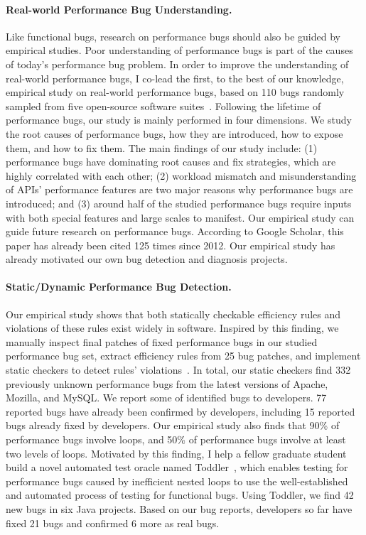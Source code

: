 \documentclass[10pt]{article}
\begin{document}
\paragraph{Real-world Performance Bug Understanding.}
Like functional bugs, research on performance bugs should also be guided by empirical studies. 
Poor understanding of performance bugs is part of the causes of today's performance bug problem. 
In order to improve the understanding of real-world performance bugs, 
I co-lead the first, to the best of our knowledge, 
empirical study on real-world performance bugs, based on 110 bugs randomly sampled from five open-source software suites~\cite{jin12perfbug}. 
Following the lifetime of performance bugs, 
our study is mainly performed in four dimensions. 
We study the root causes of performance bugs, 
how they are introduced, how to expose them, and how to fix them. 
The main findings of our study include: 
(1) performance bugs have dominating root causes and fix strategies, which are highly correlated with each other; 
(2) workload mismatch and misunderstanding of APIs' performance features are two major reasons why performance bugs are introduced; 
and (3) around half of the studied performance bugs require inputs with both special features and large scales to manifest. 
Our empirical study can guide future research on performance bugs. According to Google Scholar, this paper has already been cited 125 times since 2012. 
Our empirical study has already motivated our own bug detection and diagnosis projects.

\vspace{-.1in}
\paragraph{Static/Dynamic Performance Bug Detection.}
Our empirical study shows that both statically checkable efficiency rules and violations of these rules exist widely in software. 
Inspired by this finding,
we manually inspect final patches of fixed performance bugs in our studied performance bug set, 
extract efficiency rules from 25 bug patches, 
and implement static checkers to detect rules' violations~\cite{jin12perfbug}. 
In total, our static checkers find 332 previously unknown performance bugs from the latest versions of Apache, Mozilla, and MySQL. 
We report some of identified bugs to developers. 
77 reported bugs have already been confirmed by developers, including 15 reported bugs already fixed by developers. 
Our empirical study also finds that 90\% of performance bugs involve loops, 
and 50\% of performance bugs involve at least two levels of loops. 
Motivated by this finding, I help a fellow graduate student build a novel automated test oracle named Toddler~\cite{Nistor13ICSE},
which enables testing for performance bugs caused by inefficient nested loops to use the well-established and automated process of testing for functional bugs. 
Using Toddler, we find 42 new bugs in six Java projects.
Based on our bug reports, developers so far have fixed 21 bugs and confirmed 6 more as real bugs.
\end{document}
